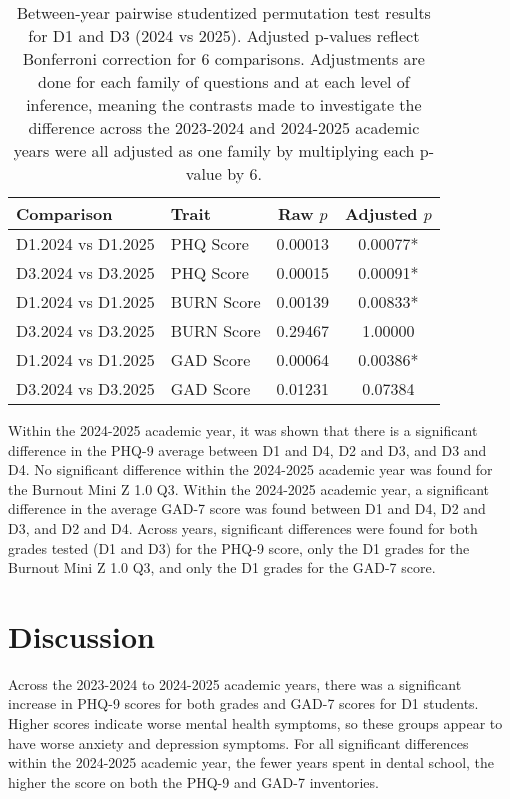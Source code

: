 \documentclass{article}
\begin{document}
\begin{table}[H]
\centering
\begin{tabular}{llcc}
\hline
Comparison & Trait & Raw $p$ & Adjusted $p$ \\
\hline
D1.2024 vs D1.2025 & PHQ Score & 0.00013 & 0.00077* \\
D3.2024 vs D3.2025 & PHQ Score & 0.00015 & 0.00091* \\
D1.2024 vs D1.2025 & BURN Score & 0.00139 & 0.00833* \\
D3.2024 vs D3.2025 & BURN Score & 0.29467 & 1.00000 \\
D1.2024 vs D1.2025 & GAD Score & 0.00064 & 0.00386* \\
D3.2024 vs D3.2025 & GAD Score & 0.01231 & 0.07384 \\
\hline
\end{tabular}
\caption{Between-year pairwise studentized permutation test results for D1 and D3 (2024 vs 2025). Adjusted p-values reflect Bonferroni correction for 6 comparisons. Adjustments are done for each family of questions and at each level of inference, meaning the contrasts made to investigate the difference across the 2023-2024 and 2024-2025 academic years were all adjusted as one family by multiplying each p-value by 6.}
\label{tab:contrasts}
\end{table}

Within the 2024-2025 academic year, it was shown that there is a significant difference in the PHQ-9 average between D1 and D4, D2 and D3, and D3 and D4. No significant difference within the 2024-2025 academic year was found for the Burnout Mini Z 1.0 Q3. Within the 2024-2025 academic year, a significant difference in the average GAD-7 score was found between D1 and D4, D2 and D3, and D2 and D4. Across years, significant differences were found for both grades tested (D1 and D3) for the PHQ-9 score, only the D1  grades for the Burnout Mini Z 1.0 Q3, and only the D1 grades for the GAD-7 score.

\section{Discussion}
Across the 2023-2024 to 2024-2025 academic years, there was a significant increase in PHQ-9 scores for both grades and GAD-7 scores for D1 students. Higher scores indicate worse mental health symptoms, so these groups appear to have worse anxiety and depression symptoms. For all significant differences within the 2024-2025 academic year, the fewer years spent in dental school, the higher the score on both the PHQ-9 and GAD-7 inventories. 
\end{document}
